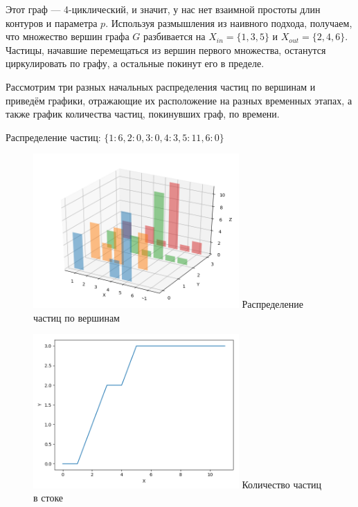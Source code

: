 Этот граф --- 4-циклический, и значит, у нас нет взаимной простоты длин контуров и параметра $p$. Используя размышления из наивного подхода, получаем, что множество вершин графа $G$ разбивается на $X_{in} = \{1, 3, 5\}$ и $X_{out} = \{2, 4, 6\}$. Частицы, начавшие перемещаться из вершин первого множества, останутся циркулировать по графу, а остальные покинут его в пределе. 

Рассмотрим три разных начальных распределения частиц по вершинам и приведём графики, отражающие их расположение на разных временных этапах, а также график количества частиц, покинувших граф, по времени. 

\newpage

\begin{example}
	Распределение частиц: $\{1: 6, 2: 0, 3: 0, 4: 3, 5: 11, 6: 0\}$
	
	\begin{figure}
		\centering	
		{\includegraphics[width=0.7\textwidth]{img/e1.png}}
		{Распределение частиц по вершинам}
		\label{fig:pic_e1}
	\end{figure}

	\begin{figure}
		\centering	
		{\includegraphics[width=0.7\textwidth]{img/e11.png}}
		{Количество частиц в стоке}
		\label{fig:pic_e11}
	\end{figure}
	
\end{example}

